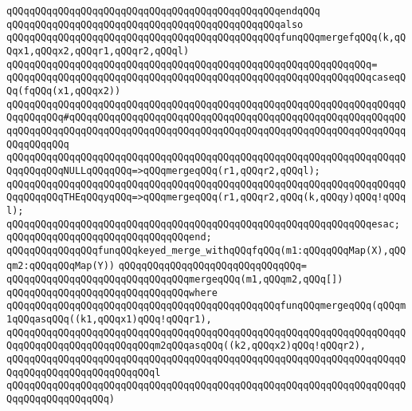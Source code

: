 \verb|qQQqqQQqqQQqqQQqqQQqqQQqqQQqqQQqqQQqqQQqqQQqqQQqendqQQq|\newline
\newline
\verb|qQQqqQQqqQQqqQQqqQQqqQQqqQQqqQQqqQQqqQQqqQQqqQQqalso|\newline
\verb|qQQqqQQqqQQqqQQqqQQqqQQqqQQqqQQqqQQqqQQqqQQqqQQqfunqQQqmergefqQQq(k,qQQqx1,qQQqx2,qQQqr1,qQQqr2,qQQql)|\newline
\verb|qQQqqQQqqQQqqQQqqQQqqQQqqQQqqQQqqQQqqQQqqQQqqQQqqQQqqQQqqQQqqQQq=|\newline
\verb|qQQqqQQqqQQqqQQqqQQqqQQqqQQqqQQqqQQqqQQqqQQqqQQqqQQqqQQqqQQqqQQqcaseqQQq(fqQQq(x1,qQQqx2))|\newline
\verb|qQQqqQQqqQQqqQQqqQQqqQQqqQQqqQQqqQQqqQQqqQQqqQQqqQQqqQQqqQQqqQQqqQQqqQQqqQQqqQQq#qQQqqQQqqQQqqQQqqQQqqQQqqQQqqQQqqQQqqQQqqQQqqQQqqQQqqQQqqQQqqQQqqQQqqQQqqQQqqQQqqQQqqQQqqQQqqQQqqQQqqQQqqQQqqQQqqQQqqQQqqQQqqQQqqQQqqQQqqQQq|\newline
\verb|qQQqqQQqqQQqqQQqqQQqqQQqqQQqqQQqqQQqqQQqqQQqqQQqqQQqqQQqqQQqqQQqqQQqqQQqqQQqqQQqNULLqQQqqQQq=>qQQqmergeqQQq(r1,qQQqr2,qQQql);|\newline
\verb|qQQqqQQqqQQqqQQqqQQqqQQqqQQqqQQqqQQqqQQqqQQqqQQqqQQqqQQqqQQqqQQqqQQqqQQqqQQqqQQqTHEqQQqyqQQq=>qQQqmergeqQQq(r1,qQQqr2,qQQq(k,qQQqy)qQQq!qQQql);|\newline
\verb|qQQqqQQqqQQqqQQqqQQqqQQqqQQqqQQqqQQqqQQqqQQqqQQqqQQqqQQqqQQqqQQqesac;|\newline
\verb|qQQqqQQqqQQqqQQqqQQqqQQqqQQqqQQqend;|\newline
\newline
\verb|qQQqqQQqqQQqqQQqfunqQQqkeyed_merge_withqQQqfqQQq(m1:qQQqqQQqMap(X),qQQqm2:qQQqqQQqMap(Y))|\newline
\verb|qQQqqQQqqQQqqQQqqQQqqQQqqQQqqQQq=|\newline
\verb|qQQqqQQqqQQqqQQqqQQqqQQqqQQqqQQqmergeqQQq(m1,qQQqm2,qQQq[])|\newline
\verb|qQQqqQQqqQQqqQQqqQQqqQQqqQQqqQQqwhere|\newline
\verb|qQQqqQQqqQQqqQQqqQQqqQQqqQQqqQQqqQQqqQQqqQQqqQQqfunqQQqmergeqQQq(qQQqm1qQQqasqQQq((k1,qQQqx1)qQQq!qQQqr1),|\newline
\verb|qQQqqQQqqQQqqQQqqQQqqQQqqQQqqQQqqQQqqQQqqQQqqQQqqQQqqQQqqQQqqQQqqQQqqQQqqQQqqQQqqQQqqQQqqQQqqQQqm2qQQqasqQQq((k2,qQQqx2)qQQq!qQQqr2),|\newline
\verb|qQQqqQQqqQQqqQQqqQQqqQQqqQQqqQQqqQQqqQQqqQQqqQQqqQQqqQQqqQQqqQQqqQQqqQQqqQQqqQQqqQQqqQQqqQQqqQQql|\newline
\verb|qQQqqQQqqQQqqQQqqQQqqQQqqQQqqQQqqQQqqQQqqQQqqQQqqQQqqQQqqQQqqQQqqQQqqQQqqQQqqQQqqQQqqQQq)|\newline
